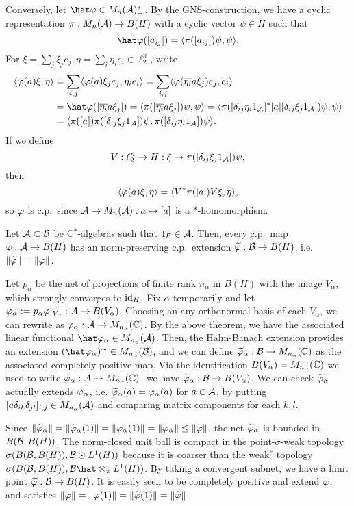 \documentclass{../../../small}
\begin{document}
\begin{pf}
Conversely, let $\hat\f\in M_n(\cA)^*_+$.
By the GNS-construction, we have a cyclic representation $\pi:M_n(\mathcal{A})\to B(H)$ with a cyclic vector $\psi\in H$ such that
\[\hat\f([a_{ij}])=\<\pi([a_{ij}])\psi,\psi\>.\]
For $\xi=\sum_j\xi_je_j,\eta=\sum_i\eta_ie_i\in\ell_2^n$, write
\begin{align*}
\<\f(a)\xi,\eta\>
&=\sum_{i,j}\<\f(a)\xi_je_j,\eta_ie_i\>
=\sum_{i,j}\<\f(\bar{\eta_i}a\xi_j)e_j,e_i\>\\
&=\hat\f([\bar{\eta_i}a\xi_j])
=\<\pi([\bar{\eta_i}a\xi_j])\psi,\psi\>
=\<\pi([\delta_{ij}\eta_i1_\cA]^*[a][\delta_{ij}\xi_j1_\cA])\psi,\psi\>\\
&=\<\pi([a])\pi([\delta_{ij}\xi_j1_\cA])\psi,\pi([\delta_{ij}\eta_i1_\cA])\psi\>.
\end{align*}
If we define
\[V:\ell_2^n\to H:\xi\mapsto\pi([\delta_{ij}\xi_j1_{\mathcal{A}}])\psi,\]
then
\[\langle\varphi(a)\xi,\eta\rangle=\langle V^*\pi([a])V\xi,\eta\rangle,\]
so $\varphi$ is c.p.~since $\mathcal{A}\to M_n(\mathcal{A}):a\mapsto[a]$ is a $*$-homomorphism.
\end{pf}

\begin{thm}
Let $\mathcal{A}\subset\mathcal{B}$ be C$^*$-algebras such that $1_{\mathcal{B}}\in\mathcal{A}$.
Then, every c.p.~map $\varphi:\mathcal{A}\to B(H)$ has an norm-preserving c.p.~extension $\widetilde{\varphi}:\mathcal{B}\to B(H)$, i.e. $\|\widetilde{\varphi}\|=\|\varphi\|$.
\end{thm}
\begin{pf}
Let $p_\alpha$ be the net of projections of finite rank $n_\alpha$ in $B(H)$ with the image $V_\alpha$, which strongly converges to $\operatorname{id}_H$.
Fix $\alpha$ temporarily and let $\varphi_\alpha:=p_\alpha\varphi|_{V_\alpha}:\mathcal{A}\to B(V_\alpha)$.
Choosing an any orthonormal basis of each $V_\alpha$, we can rewrite as $\varphi_\alpha:\mathcal{A}\to M_{n_\alpha}(\mathbb{C})$.
By the above theorem, we have the associated linear functional $\hat\f_\alpha\in M_{n_\alpha}(\cA)$.
Then, the Hahn-Banach extension provides an extension $(\hat\f_\alpha)^\sim\in M_{n_\alpha}(\cB)$, and we can define $\widetilde{\varphi}_\alpha:\mathcal{B}\to M_{n_\alpha}(\mathbb{C})$ as the associated completely positive map.
Via the identification $B(V_\alpha)=M_{n_\alpha}(\mathbb{C})$ we used to write $\varphi_\alpha:\mathcal{A}\to M_{n_\alpha}(\mathbb{C})$, we have $\widetilde{\varphi}_\alpha:\mathcal{B}\to B(V_\alpha)$.
We can check $\widetilde{\varphi}_\alpha$ actually extends $\varphi_\alpha$, i.e. $\widetilde{\varphi}_\alpha(a)=\varphi_\alpha(a)$ for $a\in\mathcal{A}$, by putting $[a\delta_{ik}\delta_{jl}]_{i,j}\in M_{n_\alpha}(\mathcal{A})$ and comparing matrix components for each $k,l$.

Since $\|\widetilde{\varphi}_\alpha\|=\|\widetilde{\varphi}_\alpha(1)\|=\|\varphi_\alpha(1)\|=\|\varphi_\alpha\|\le\|\varphi\|$, the net $\widetilde{\varphi}_\alpha$ is bounded in $B(\mathcal{B},B(H))$.
The norm-closed unit ball is compact in the point-$\sigma$-weak topology $\sigma(B(\mathcal{B},B(H)),\mathcal{B}\odot L^1(H))$ because it is coarser than the weak$^*$ topology $\sigma(B(\cB,B(H)),\cB\hat\otimes_\pi L^1(H))$.
By taking a convergent subnet, we have a limit point $\widetilde{\varphi}:\mathcal{B}\to B(H)$.
It is easily seen to be completely positive and extend $\varphi$, and satisfies $\|\varphi\|=\|\varphi(1)\|=\|\widetilde{\varphi}(1)\|=\|\widetilde{\varphi}\|$.
\end{pf}
\end{document}
